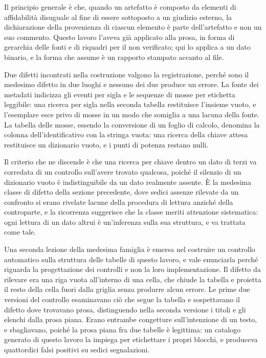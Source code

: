 Il principio generale è che, quando un artefatto è composto da elementi di affidabilità disuguale al fine di essere sottoposto a un giudizio esterno, la dichiarazione della provenienza di ciascun elemento è parte dell'artefatto e non un suo commento. Questo lavoro l'aveva già applicato alla prosa, in forma di gerarchia delle fonti e di riquadri per il non verificato; qui lo applica a un dato binario, e la forma che assume è un rapporto stampato accanto al file.

Due difetti incontrati nella costruzione valgono la registrazione, perché sono il medesimo difetto in due luoghi e nessuno dei due produce un errore. La fonte dei metadati indicizza gli eventi per sigla e le sequenze di mosse per etichetta leggibile: una ricerca per sigla nella seconda tabella restituisce l'insieme vuoto, e l'esemplare esce privo di mosse in un modo che somiglia a una lacuna della fonte. La tabella delle mosse, essendo la conversione di un foglio di calcolo, denomina la colonna dell'identificativo con la stringa vuota: una ricerca della chiave attesa restituisce un dizionario vuoto, e i punti di potenza restano nulli.

Il criterio che ne discende è che una ricerca per chiave dentro un dato di terzi va corredata di un controllo sull'avere trovato qualcosa, poiché il silenzio di un dizionario vuoto è indistinguibile da un dato realmente assente. È la medesima classe di difetto della sezione precedente, dove sedici assenze rilevate da un confronto si erano rivelate lacune della procedura di lettura anziché della controparte, e la ricorrenza suggerisce che la classe meriti attenzione sistematica: ogni lettura di un dato altrui è un'inferenza sulla sua struttura, e va trattata come tale.

Una seconda lezione della medesima famiglia è emersa nel costruire un controllo automatico sulla struttura delle tabelle di questo lavoro, e vale enunciarla perché riguarda la progettazione dei controlli e non la loro implementazione. Il difetto da rilevare era una riga vuota all'interno di una cella, che chiude la tabella e proietta il resto della cella fuori dalla griglia senza produrre alcun errore. Le prime due versioni del controllo esaminavano ciò che segue la tabella e sospettavano il difetto dove trovavano prosa, distinguendo nella seconda versione i titoli e gli elenchi dalla prosa piana. Erano entrambe congetture sull'intenzione di un testo, e sbagliavano, poiché la prosa piana fra due tabelle è legittima: un catalogo generato di questo lavoro la impiega per etichettare i propri blocchi, e produceva quattordici falsi positivi su sedici segnalazioni.

